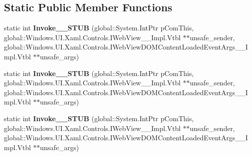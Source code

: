 \subsection*{Static Public Member Functions}
\begin{DoxyCompactItemize}
\item 
\mbox{\label{struct_windows_1_1_foundation_1_1_typed_event_handler___a___windows___u_i___xaml___controls___we5ac43aef74fa54d3107343c3c79b75ac_aa98cd590d255e23e001dbf65280ae500}} 
static int {\bfseries Invoke\+\_\+\+\_\+\+S\+T\+UB} (global\+::\+System.\+Int\+Ptr p\+Com\+This, global\+::\+Windows.\+U\+I.\+Xaml.\+Controls.\+I\+Web\+View\+\_\+\+\_\+\+Impl.\+Vtbl $\ast$$\ast$unsafe\+\_\+sender, global\+::\+Windows.\+U\+I.\+Xaml.\+Controls.\+I\+Web\+View\+D\+O\+M\+Content\+Loaded\+Event\+Args\+\_\+\+\_\+\+Impl.\+Vtbl $\ast$$\ast$unsafe\+\_\+args)
\item 
\mbox{\label{struct_windows_1_1_foundation_1_1_typed_event_handler___a___windows___u_i___xaml___controls___we5ac43aef74fa54d3107343c3c79b75ac_aa98cd590d255e23e001dbf65280ae500}} 
static int {\bfseries Invoke\+\_\+\+\_\+\+S\+T\+UB} (global\+::\+System.\+Int\+Ptr p\+Com\+This, global\+::\+Windows.\+U\+I.\+Xaml.\+Controls.\+I\+Web\+View\+\_\+\+\_\+\+Impl.\+Vtbl $\ast$$\ast$unsafe\+\_\+sender, global\+::\+Windows.\+U\+I.\+Xaml.\+Controls.\+I\+Web\+View\+D\+O\+M\+Content\+Loaded\+Event\+Args\+\_\+\+\_\+\+Impl.\+Vtbl $\ast$$\ast$unsafe\+\_\+args)
\item 
\mbox{\label{struct_windows_1_1_foundation_1_1_typed_event_handler___a___windows___u_i___xaml___controls___we5ac43aef74fa54d3107343c3c79b75ac_aa98cd590d255e23e001dbf65280ae500}} 
static int {\bfseries Invoke\+\_\+\+\_\+\+S\+T\+UB} (global\+::\+System.\+Int\+Ptr p\+Com\+This, global\+::\+Windows.\+U\+I.\+Xaml.\+Controls.\+I\+Web\+View\+\_\+\+\_\+\+Impl.\+Vtbl $\ast$$\ast$unsafe\+\_\+sender, global\+::\+Windows.\+U\+I.\+Xaml.\+Controls.\+I\+Web\+View\+D\+O\+M\+Content\+Loaded\+Event\+Args\+\_\+\+\_\+\+Impl.\+Vtbl $\ast$$\ast$unsafe\+\_\+args)
\item 

\end{DoxyCompactItemize}
